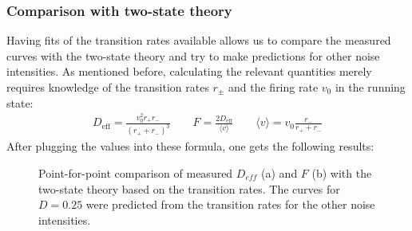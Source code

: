\documentclass[12pt,a4paper]{article}
\begin{document}
\subsubsection{Comparison with two-state theory}\label{tstsn}
Having fits of the transition rates available allows us to compare the measured curves with the two-state theory and try to make predictions for other noise intensities. As mentioned before, calculating the relevant quantities merely requires knowledge of the transition rates $r_\pm$ and the firing rate $v_0$ in the running state:
\begin{align*}
D_{\text{eff}}=\frac{v_0^2 r_+r_-}{(r_++r_-)^3}\qquad F=\frac{2D_{\text{eff}}}{\langle v\rangle}\qquad\langle v\rangle=v_0\frac{r_-}{r_++r_-}
\end{align*}
After plugging the values into these formula, one gets the following results:
\begin{figure}[H]
	\hspace*{-0.5cm}
	\caption{Point-for-point comparison of measured $D_{eff}$ (a) and $F$ (b) with the two-state theory based on the transition rates. The curves for $D=0.25$ were predicted from the transition rates for the other noise intensities.}
\end{figure}
\end{document}
